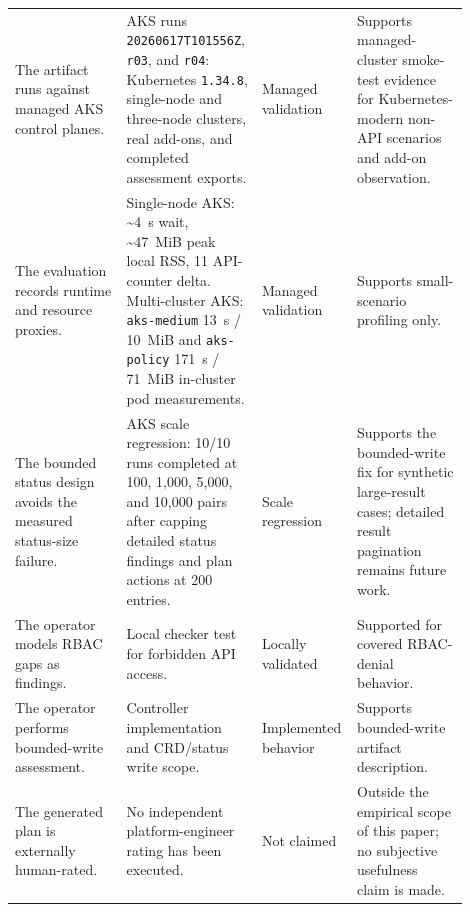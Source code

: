 \documentclass[10pt,journal]{IEEEtran}
\newcommand{\code}[1]{\texttt{#1}}
\begin{document}
\begin{table}[t]
\begin{tabular}{p{0.24\linewidth}p{0.26\linewidth}p{0.16\linewidth}p{0.24\linewidth}}
    The artifact runs against managed AKS control planes. & AKS runs \code{20260617T101556Z}, \code{r03}, and \code{r04}: Kubernetes \code{1.34.8}, single-node and three-node clusters, real add-ons, and completed assessment exports. & Managed validation & Supports managed-cluster smoke-test evidence for Kubernetes-modern non-API scenarios and add-on observation. \\
    The evaluation records runtime and resource proxies. & Single-node AKS: \~{}4~s wait, \~{}47~MiB peak local RSS, 11 API-counter delta. Multi-cluster AKS: \code{aks-medium} 13~s / 10~MiB and \code{aks-policy} 171~s / 71~MiB in-cluster pod measurements. & Managed validation & Supports small-scenario profiling only. \\
    The bounded status design avoids the measured status-size failure. & AKS scale regression: 10/10 runs completed at 100, 1,000, 5,000, and 10,000 pairs after capping detailed status findings and plan actions at 200 entries. & Scale regression & Supports the bounded-write fix for synthetic large-result cases; detailed result pagination remains future work. \\
    The operator models RBAC gaps as findings. & Local checker test for forbidden API access. & Locally validated & Supported for covered RBAC-denial behavior. \\
    The operator performs bounded-write assessment. & Controller implementation and CRD/status write scope. & Implemented behavior & Supports bounded-write artifact description. \\
    The generated plan is externally human-rated. & No independent platform-engineer rating has been executed. & Not claimed & Outside the empirical scope of this paper; no subjective usefulness claim is made. \\
    \bottomrule
  \end{tabular}
\end{table}
\end{document}

